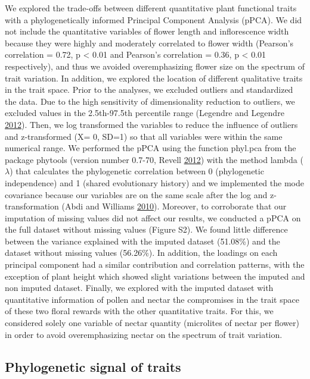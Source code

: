 \documentclass[11pt,a4paper,]{article}
\begin{document}
We explored the trade-offs between different quantitative plant
functional traits with a phylogenetically informed Principal Component
Analysis (pPCA). We did not include the quantitative variables of flower
length and inflorescence width because they were highly and moderately
correlated to flower width (Pearson's correlation = 0.72, p \textless{}
0.01 and Pearson's correlation = 0.36, p \textless{} 0.01 respectively),
and thus we avoided overemphasizing flower size on the spectrum of trait
variation. In addition, we explored the location of different
qualitative traits in the trait space. Prior to the analyses, we
excluded outliers and standardized the data. Due to the high sensitivity
of dimensionality reduction to outliers, we excluded values in the
2.5th-97.5th percentile range (Legendre and Legendre
\protect\hyperlink{ref-legendre2012}{2012}). Then, we log transformed
the variables to reduce the influence of outliers and z-transformed (X=
0, SD=1) so that all variables were within the same numerical range. We
performed the pPCA using the function phyl.pca from the package phytools
(version number 0.7-70, Revell \protect\hyperlink{ref-revell2012}{2012})
with the method lambda (\(\lambda\)) that calculates the phylogenetic
correlation between 0 (phylogenetic independence) and 1 (shared
evolutionary history) and we implemented the mode covariance because our
variables are on the same scale after the log and z-transformation (Abdi
and Williams \protect\hyperlink{ref-abdi2010}{2010}). Moreover, to
corroborate that our imputation of missing values did not affect our
results, we conducted a pPCA on the full dataset without missing values
(Figure S2). We found little difference between the variance explained
with the imputed dataset (51.08\%) and the dataset without missing
values (56.26\%). In addition, the loadings on each principal component
had a similar contribution and correlation patterns, with the exception
of plant height which showed slight variations between the imputed and
non imputed dataset. Finally, we explored with the imputed dataset with
quantitative information of pollen and nectar the compromises in the
trait space of these two floral rewards with the other quantitative
traits. For this, we considered solely one variable of nectar quantity
(microlites of nectar per flower) in order to avoid overemphasizing
nectar on the spectrum of trait variation.

\subsection{Phylogenetic signal of
traits}\label{phylogenetic-signal-of-traits}
\end{document}
